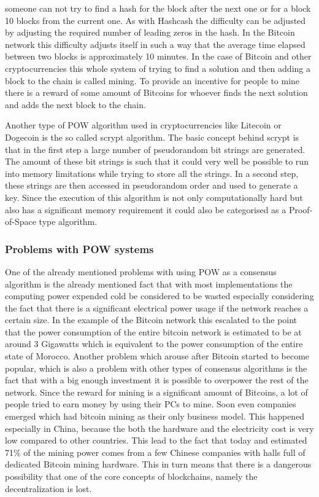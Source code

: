 someone can not try to find a hash for the block after the next one or for a block 10 blocks from the current one. As with Hashcash the difficulty can be adjusted by adjusting the required number
of leading zeros in the hash. In the Bitcoin network this difficulty adjusts itself in such a way that the average time elapsed between two blocks is approximately 10 minutes.
In the case of Bitcoin and other cryptocurrencies this whole system of trying to find a solution and then adding a block to the chain is called mining. To provide an incentive for
people to mine there is a reward of some amount of Bitcoins for whoever finds the next solution and adds the next block to the chain.\cite{url:bitcoin}\par
Another type of POW algorithm used in cryptocurrencies like Litecoin or Dogecoin is the so called scrypt algorithm.\cite{url:litecoin_dogecoin} The basic concept behind scrypt is that in the first 
step a large number of pseudorandom bit strings are generated. The amount of these bit strings is such that it could very well be possible to run into memory limitations while trying to store 
all the strings. In a second step, these strings are then accessed in pseudorandom order and used to generate a key. Since the execution of this algorithm is not only computationally hard but
also has a significant memory requirement it could also be categorised as a Proof-of-Space type algorithm.\cite{url:scrypt}

\subsubsection{Problems with POW systems}

One of the already mentioned problems with using POW as a consensus algorithm is the already mentioned fact that with most implementations the computing power expended cold be considered
to be wasted especially considering the fact that there is a significant electrical power usage if the network reaches a certain size. In the example of the Bitcoin network this escalated to
the point that the power consumption of the entire bitcoin network is estimated to be at around 3 Gigawatts which is equivalent to the power consumption of the entire state of Morocco.\cite{url:btc_power}
Another problem which arouse after Bitcoin started to become popular, which is also a problem with other types of consensus algorithms is the fact that with a big enough investment it is possible
to overpower the rest of the network. Since the reward for mining is a significant amount of Bitcoins, a lot of people tried to earn money by using their PCs to mine. Soon even companies emerged
which had bitcoin mining as their only business model. This happened especially in China, because the both the hardware and the electricity cost is very low compared to other countries. This lead
to the fact that today and estimated 71\% of the mining power comes from a few Chinese companies with halls full of dedicated Bitcoin mining hardware. This in turn means that there is a dangerous
possibility that one of the core concepts of blockchains, namely the decentralization is lost.\cite{url:btc_china}

